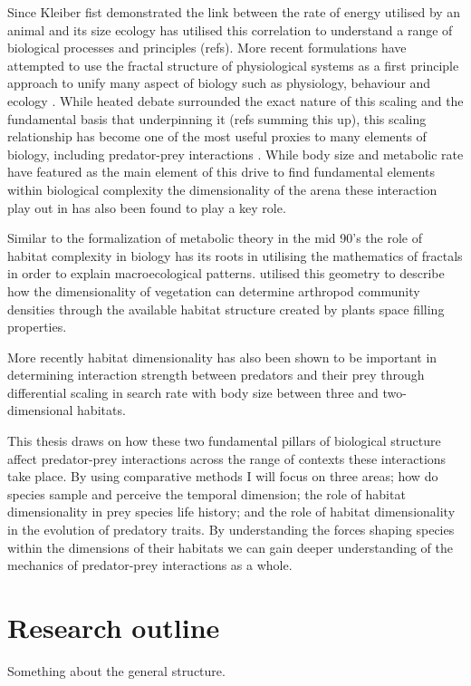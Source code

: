 Since Kleiber fist demonstrated the link between the rate of energy utilised by an animal and its size \citep{kleiber1947body} ecology has utilised this correlation to understand a range of biological processes and principles (refs). More recent formulations have attempted to use the fractal structure of physiological systems as a first principle approach to unify many aspect of biology such as physiology, behaviour and ecology \citep{west1997general,brown2004}. While heated debate surrounded the exact nature of this scaling and the fundamental basis that underpinning it (refs summing this up), this scaling relationship has become one of the most useful proxies to many elements of biology, including predator-prey interactions \citep{brown2004}. While body size and metabolic rate have featured as the main element of this drive to find fundamental elements within biological complexity the dimensionality of the arena these interaction play out in has also been found to play a key role.


Similar to the formalization of metabolic theory in the mid 90's the role of habitat complexity in biology has its roots in utilising the mathematics of fractals in order to explain macroecological patterns. \cite{morse1985fractal} utilised this geometry to describe how the dimensionality of vegetation can determine arthropod community densities through the available habitat structure created by plants space filling properties.

 More recently habitat dimensionality has also been shown to be important in determining interaction strength between predators and their prey through differential scaling in search rate with body size between three and two-dimensional habitats. 


This thesis draws on how these two fundamental pillars of biological structure affect predator-prey interactions across the range of contexts these interactions take place. By using comparative methods I will focus on three areas; how do species sample and perceive the temporal dimension; the role of habitat dimensionality in prey species life history; and the role of habitat dimensionality in the evolution of predatory traits. By understanding the forces shaping species within the dimensions of their habitats we can gain deeper understanding of the mechanics of predator-prey interactions as a whole.


\section{\uppercase{R}esearch outline}
Something about the general structure.


